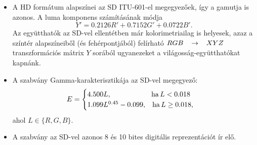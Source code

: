\begin{itemize}
A különböző HD formátumok jelölése a következő:
\begin{itemize}
\item Teljes aktív felbontás pixelben kifejezve.
Gyakran rövidítésképp csak a vertikális méretet jelölik meg.
\item képletapogatás módja: $p$ a progresszív, $i$ az interlaced letapogatást jelöli
\item képfrekvencia (frame rate) mind $p$, mind $i$ esetben.
Interlaced videó esetén gyakran a képfrekvencia helyett---hibásan---a félképfrekvenciát jelölik.
\end{itemize}
Így pl. az $1080i25$ a 1080 soros, váltottsoros $25~\mathrm{Hz}$ képfrekvenciájú, és $50~\mathrm{Hz}$ félkép-frekvenciájú formátumot jelöli.
\begin{figure}[]
	\centering
	\begin{overpic}[width = 1 \columnwidth ]{Figures/HD_format.png}
	\small
	\end{overpic}
	\caption{Az 1080 soros és 720 soros HD formátum szemléltetése}
	\label{Fig:HD_formats}
\end{figure}

A progresszív HD formátumok nagy adatsebesség-igénye miatt az ITU-709-et néhány évvel később kibővítették egy alacsonyabb felbontású formátummal, ez 720 aktív sort és 1280 aktív pixelt alkalmaz, és kizárólag progresszív letapogatással definiálták \footnote{Az 1080p bevezetése során az egyik kitűzött cél a legalább duplázott sorszám volt.
A 720p az SD és HD között félúton: másfélszeres sort alkalmaz így a sorszáma $\frac{3}{2} \cdot 480 = 720$-ból adódik, míg az oszlopszám a 16:9 képarányból, négyzetes pixelek mellett}.
Jelölése: \textbf{720p}.
A két HD formátumra egy-egy példa a \ref{Fig:HD_formats} ábrán látható.
\item A HD formátum alapszínei az SD ITU-601-el megegyezőek, így a gamutja is azonos.
A luma komponens számításának módja 
\begin{equation}
Y' = 0.2126 R' + 0.7152 G' + 0.0722B'.
\end{equation}
Az együtthatók az SD-vel ellentétben már kolorimetriailag is helyesek, azaz a színtér alapszíneiből (és fehérpontjából) felírható $RGB \hspace{3mm} \rightarrow \hspace{3mm} XYZ$ transzformációs mátrix $Y$ sorából ugyanezeket a világosság-együtthatókat kapnánk.
\item A szabvány Gamma-karakterisztikája az SD-vel megegyező:
\begin{equation}
E = 
\begin{cases}
4.500 L, \hspace{20mm} \mathrm{ha}\, L < 0.018 \\
1.099 L^{0.45} - 0.099, \hspace{3mm} \mathrm{ha}\, L \geq 0.018,
\end{cases}
\end{equation}
ahol $L \in \{ R, G, B \}$.
\item A szabvány az SD-vel azonos 8 és 10 bites digitális reprezentációt ír elő.
\end{itemize}

